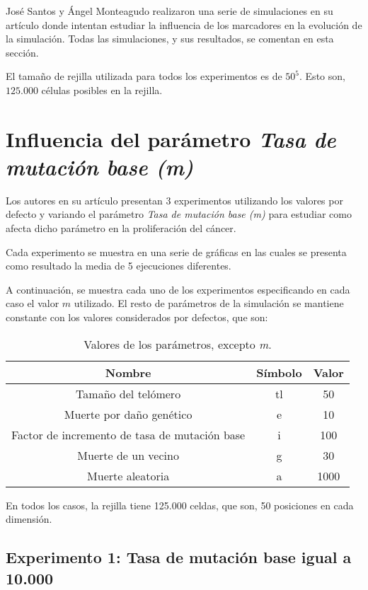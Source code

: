 José Santos y Ángel Monteagudo realizaron una serie de simulaciones en su artículo
donde intentan estudiar la influencia de los marcadores en la evolución de la simulación.
Todas las simulaciones, y sus resultados, se comentan en esta sección.

El tamaño de rejilla utilizada para todos los experimentos es de $50^5$. Esto son,
$125.000$ células posibles en la rejilla.

\section{Influencia del parámetro \textit{Tasa de mutación base (m)}}

Los autores en su artículo presentan 3 experimentos utilizando los valores por defecto
y variando el parámetro \textit{Tasa de mutación base (m)} para estudiar como afecta
dicho parámetro en la proliferación del cáncer.

Cada experimento se muestra en una serie de gráficas en las cuales se presenta
como resultado la media de 5 ejecuciones diferentes.

A continuación, se muestra cada uno de los experimentos especificando en cada caso
el valor $m$ utilizado. El resto de parámetros de la simulación se mantiene constante
con los valores considerados por defectos, que son:

\begin{table}[h!]
  \centering
  \caption{Valores de los parámetros, excepto \textit{m}.}
  \label{tab:table1}
  \begin{tabular}{ccc}
    \toprule
    Nombre & Símbolo & Valor\\
    \midrule
    Tamaño del telómero & tl & 50\\
    Muerte por daño genético & e & 10\\
    Factor de incremento de tasa de mutación base & i & 100\\
    Muerte de un vecino & g & 30\\
    Muerte aleatoria & a & 1000\\
    \bottomrule
  \end{tabular}
\end{table}

En todos los casos, la rejilla tiene 125.000 celdas, que son, 50 posiciones en cada dimensión.

\subsection{Experimento 1: Tasa de mutación base igual a 10.000}

